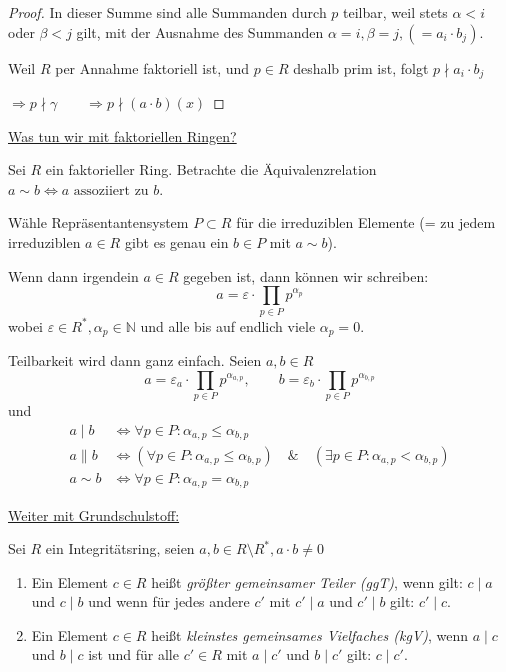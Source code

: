 \documentclass[a4paper,12pt,numbers=noenddot,parskip=full]{scrartcl}
\newcommand{\setN}{\mathbb{N}}
\newcommand{\heading}{\underline}
\theoremstyle{dotless}
\theoremstyle{remark}
\begin{document}
\begin{proof}
		In dieser Summe sind alle Summanden durch $p$ teilbar, weil stets $\alpha < i$ oder $\beta < j$ gilt, mit der Ausnahme des Summanden $\alpha = i, \beta = j, (= a_i \cdot b_j)$.
		
		Weil $R$ per Annahme faktoriell ist, und $p \in R$ deshalb prim ist, folgt $ p \nmid a_i \cdot b_j$
		
		$\Rightarrow p \nmid \gamma \qquad \Rightarrow p \nmid (a \cdot b)(x)$
	\end{proof}

	\heading{Was tun wir mit faktoriellen Ringen?}
	
	Sei $R$ ein faktorieller Ring. Betrachte die Äquivalenzrelation $a \sim b \Leftrightarrow a \text{ assoziiert zu } b$.
	
	Wähle Repräsentantensystem $P \subset R$ für die irreduziblen Elemente (= zu jedem irreduziblen $a \in R$ gibt es genau ein $b \in P$ mit $a \sim b$).
	
	Wenn dann irgendein $a \in R$ gegeben ist, dann können wir schreiben:
	\begin{equation*}
		a = \varepsilon \cdot \prod_{p \in P} p^{\alpha_p}
	\end{equation*}
	wobei $\varepsilon \in R^*, \alpha_p \in \setN$ und alle bis auf endlich viele $\alpha_p = 0$.
	
	Teilbarkeit wird dann ganz einfach. Seien $a, b \in R$
	\begin{equation*}
		a = \varepsilon_a \cdot \prod_{p \in P} p^{\alpha_{a,p}}, \qquad b = \varepsilon_b \cdot \prod_{p \in P} p^{\alpha_{b,p}}
	\end{equation*}
	und
	\begin{align*}
		a \mid b &\Leftrightarrow \forall p \in P: \alpha_{a,p} \leq \alpha_{b,p} \\
		a \parallel b &\Leftrightarrow (\forall p \in P: \alpha_{a,p} \leq \alpha_{b,p}) \quad\&\quad (\exists p \in P: \alpha_{a,p} < \alpha_{b,p})\\
		a \sim b &\Leftrightarrow \forall p \in P: \alpha_{a,p} = \alpha_{b,p}
	\end{align*}
	
	\heading{Weiter mit Grundschulstoff:}
	
	Sei $R$ ein Integritätsring, seien $a,b \in R \setminus R^*, a \cdot b \neq 0$
	
	\begin{enumerate}
		\item Ein Element $c \in R$ heißt \emph{größter gemeinsamer Teiler (ggT)}, wenn gilt: $c \mid a$ und $c \mid b$ und wenn für jedes andere $c'$ mit $c' \mid a$ und $c' \mid b$ gilt: $c' \mid c$.
		\item Ein Element $c \in R$ heißt \emph{kleinstes gemeinsames Vielfaches (kgV)}, wenn $a \mid c$ und $b \mid c$ ist und für alle $c' \in R$ mit $a \mid c'$ und $b \mid c'$ gilt: $c \mid c'$.
	\end{enumerate}
\end{document}
